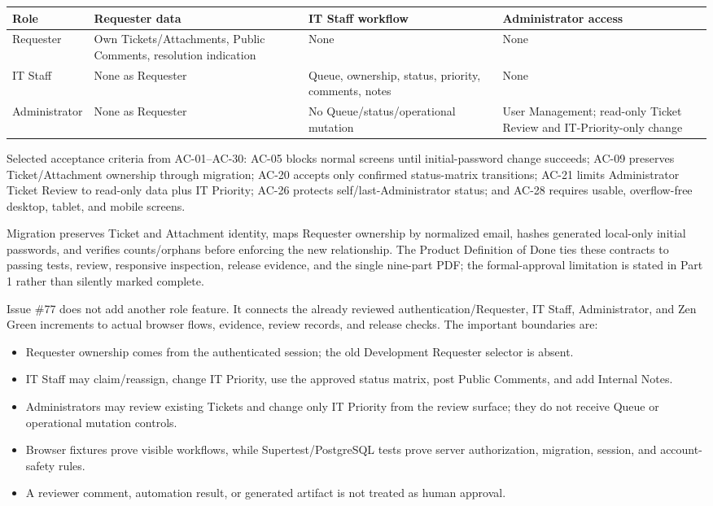 \documentclass[10pt,a4paper]{article}
\begin{document}
\begin{center}\small
\begin{tabularx}{\linewidth}{@{}p{25mm}YYY@{}}
\toprule
Role & Requester data & IT Staff workflow & Administrator access \\
\midrule
Requester & Own Tickets/Attachments, Public Comments, resolution indication & None & None \\
IT Staff & None as Requester & Queue, ownership, status, priority, comments, notes & None \\
Administrator & None as Requester & No Queue/status/operational mutation & User Management; read-only Ticket Review and IT-Priority-only change \\
\bottomrule
\end{tabularx}
\end{center}

Selected acceptance criteria from AC-01--AC-30: AC-05 blocks normal screens until
initial-password change succeeds; AC-09 preserves Ticket/Attachment ownership
through migration; AC-20 accepts only confirmed status-matrix transitions;
AC-21 limits Administrator Ticket Review to read-only data plus IT Priority;
AC-26 protects self/last-Administrator status; and AC-28 requires usable,
overflow-free desktop, tablet, and mobile screens.

Migration preserves Ticket and Attachment identity, maps Requester ownership
by normalized email, hashes generated local-only initial passwords, and verifies
counts/orphans before enforcing the new relationship. The Product Definition
of Done ties these contracts to passing tests, review, responsive inspection,
release evidence, and the single nine-part PDF; the formal-approval limitation
is stated in Part 1 rather than silently marked complete.

Issue \#77 does not add another role feature. It connects the already reviewed
authentication/Requester, IT Staff, Administrator, and Zen Green increments to
actual browser flows, evidence, review records, and release checks. The
important boundaries are:

\begin{itemize}
  \item Requester ownership comes from the authenticated session; the old Development Requester selector is absent.
  \item IT Staff may claim/reassign, change IT Priority, use the approved status matrix, post Public Comments, and add Internal Notes.
  \item Administrators may review existing Tickets and change only IT Priority from the review surface; they do not receive Queue or operational mutation controls.
  \item Browser fixtures prove visible workflows, while Supertest/PostgreSQL tests prove server authorization, migration, session, and account-safety rules.
  \item A reviewer comment, automation result, or generated artifact is not treated as human approval.
\end{itemize}
\end{document}
